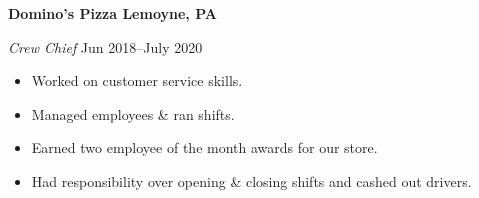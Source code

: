 \textbf{Domino's Pizza \hfill  Lemoyne, PA} \par
\textit{Crew Chief} \hfill Jun 2018--July 2020 \par
\begin{itemize}
	\item Worked on customer service skills.
	\item Managed employees \& ran shifts.
	\item Earned two employee of the month awards for our store.
	\item Had responsibility over opening \& closing shifts and cashed out drivers.
\end{itemize} \par
